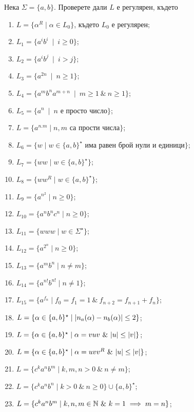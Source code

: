 \begin{problem}
  Нека $\Sigma = \{a,b\}$.  Проверете дали $L$ е регулярен, където
  \begin{enumerate}[1)]
  \item
    $L = \{\alpha^R \mid \alpha \in L_0\}$, където $L_0$ е регулярен;
  \item
    $L_1 = \{a^ib^i\ \mid\ i\geq 0\}$;
  \item
    $L_2 = \{a^ib^j\ \mid\ i > j\}$;
  \item
    $L_3 = \{a^{2n}\ \mid\ n\geq 1\}$;
  \item
    $L_4 = \{a^mb^na^{m+n}\ \mid\ m\geq 1\ \&\ n\geq 1\}$;
  \item
    $L_5 = \{a^n\ \mid\ n\mbox{ е просто число}\}$;
  \item
    $L = \{a^{n.m}\mid n,m\mbox{ са прости числа}\}$;
  \item
    $L_6 = \{w\mid w\in\{a,b\}^\star\mbox{ има равен брой нули и единици}\}$;
  \item
    $L_7 = \{ww\mid w\in\{a,b\}^\star\}$;
  \item
    $L_8 = \{ww^R\mid w\in\{a,b\}^\star\}$;
  \item
    $L_9= \{a^{n^2}\mid n\geq 0\}$;
  \item
    $L_{10} = \{a^nb^nc^n\mid n\geq 0\}$;
  \item
    $L_{11} = \{www\mid w\in \Sigma^\star\}$;
  \item
    $L_{12} = \{a^{2^n}\mid n\geq 0\}$;
  \item
    $L_{13} = \{a^mb^n\mid n\neq m\}$;
  \item
    $L_{14} = \{a^{n!}b^{n!}\mid n\neq 1\}$;
  \item
    $L_{15} = \{a^{f_n} \mid f_0 = f_1 = 1\ \&\ f_{n+2} = f_{n+1} + f_{n}\}$;
  \item
    $L = \{\alpha \in \{a,b\}^\star \mid \vert{n_a(\alpha) - n_b(\alpha)}\vert \leq 2\}$;
  \item
    $L = \{\alpha \in \{a,b\}^\star \mid \alpha = vuv\ \&\ \vert{u}\vert \leq \vert{v}\vert\}$;
  \item
    $L = \{\alpha \in \{a,b\}^\star \mid \alpha = uvv^R\ \&\ \vert{u}\vert \leq \vert{v}\vert\}$;
  \item
    $L = \{c^ka^nb^m \mid k,m,n > 0\ \&\ n \neq m\}$;
  \item
    $L = \{c^ka^nb^n \mid k > 0\ \&\ n \geq 0\}\cup\{a,b\}^\star$;
  \item
    $L = \{c^ka^nb^m\mid k,n,m \in \Nat\ \&\ k = 1\implies m = n\}$; %
  \end{enumerate}
\end{problem}
